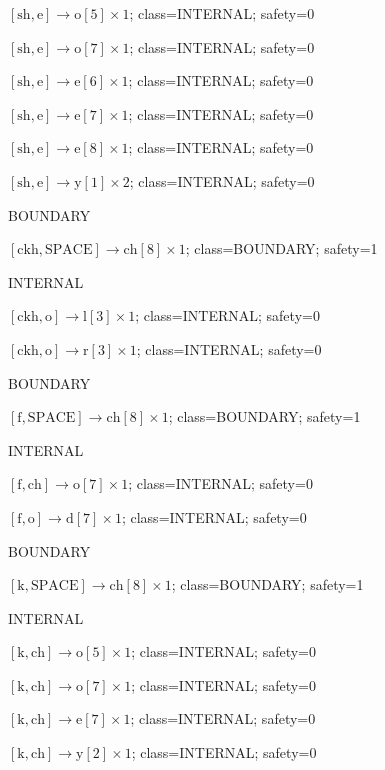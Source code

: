 \(\left[\mathrm{sh}, \mathrm{e}\right] \to \mathrm{o}[5] \times 1\); class=INTERNAL; safety=0\par
\(\left[\mathrm{sh}, \mathrm{e}\right] \to \mathrm{o}[7] \times 1\); class=INTERNAL; safety=0\par
\(\left[\mathrm{sh}, \mathrm{e}\right] \to \mathrm{e}[6] \times 1\); class=INTERNAL; safety=0\par
\(\left[\mathrm{sh}, \mathrm{e}\right] \to \mathrm{e}[7] \times 1\); class=INTERNAL; safety=0\par
\(\left[\mathrm{sh}, \mathrm{e}\right] \to \mathrm{e}[8] \times 1\); class=INTERNAL; safety=0\par
\(\left[\mathrm{sh}, \mathrm{e}\right] \to \mathrm{y}[1] \times 2\); class=INTERNAL; safety=0\par
BOUNDARY\par
\(\left[\mathrm{ckh}, \mathrm{SPACE}\right] \to \mathrm{ch}[8] \times 1\); class=BOUNDARY; safety=1\par
INTERNAL\par
\(\left[\mathrm{ckh}, \mathrm{o}\right] \to \mathrm{l}[3] \times 1\); class=INTERNAL; safety=0\par
\(\left[\mathrm{ckh}, \mathrm{o}\right] \to \mathrm{r}[3] \times 1\); class=INTERNAL; safety=0\par
BOUNDARY\par
\(\left[\mathrm{f}, \mathrm{SPACE}\right] \to \mathrm{ch}[8] \times 1\); class=BOUNDARY; safety=1\par
INTERNAL\par
\(\left[\mathrm{f}, \mathrm{ch}\right] \to \mathrm{o}[7] \times 1\); class=INTERNAL; safety=0\par
\(\left[\mathrm{f}, \mathrm{o}\right] \to \mathrm{d}[7] \times 1\); class=INTERNAL; safety=0\par
BOUNDARY\par
\(\left[\mathrm{k}, \mathrm{SPACE}\right] \to \mathrm{ch}[8] \times 1\); class=BOUNDARY; safety=1\par
INTERNAL\par
\(\left[\mathrm{k}, \mathrm{ch}\right] \to \mathrm{o}[5] \times 1\); class=INTERNAL; safety=0\par
\(\left[\mathrm{k}, \mathrm{ch}\right] \to \mathrm{o}[7] \times 1\); class=INTERNAL; safety=0\par
\(\left[\mathrm{k}, \mathrm{ch}\right] \to \mathrm{e}[7] \times 1\); class=INTERNAL; safety=0\par
\(\left[\mathrm{k}, \mathrm{ch}\right] \to \mathrm{y}[2] \times 1\); class=INTERNAL; safety=0\par
